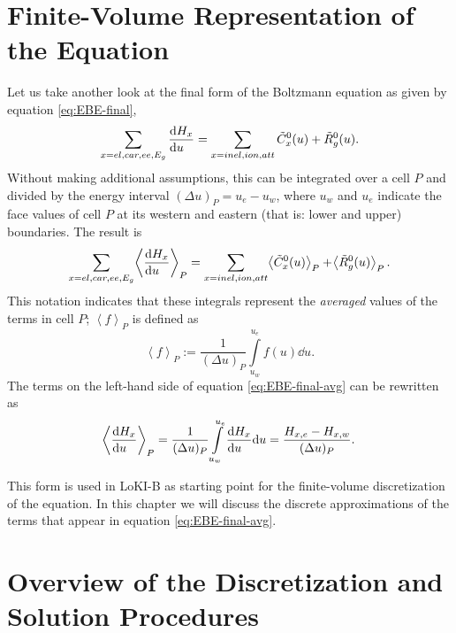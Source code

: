 \documentclass{book}
\newcommand{\MEAN}[1]{\ensuremath{\!\left\langle{{#1}}\right\rangle}}
\begin{document}
\section{Finite-Volume Representation of the Equation}

Let us take another look at the final form of the Boltzmann equation as given
by equation \eqref{eq:EBE-final},
\[
	\sum\limits_{x=el,car,ee,E_g}\DERIV{H_x}{u}
	=
	\sum\limits_{x=inel,ion,att}\tilde{C}^0_{x}(u)
	+
	\tilde{R}^0_g(u).
\]
Without making additional assumptions, this can be integrated
over a cell $P$ and divided by the energy interval $(\Delta u)_P = u_e-u_w$, where
$u_w$ and $u_e$ indicate the face values of cell $P$ at its western and eastern
(that is: lower and upper) boundaries. The result is
\begin{equation}
	\sum\limits_{x=el,car,ee,E_g}\MEAN{\DERIV{H_x}{u}}_P
	=
	\sum\limits_{x=inel,ion,att}\MEAN{\tilde{C}^0_{x}(u)}_P
	+
	\MEAN{\tilde{R}^0_g(u)}_P.
	\label{eq:EBE-final-avg}
\end{equation}
This notation indicates that these integrals represent the {\em averaged} values
of the terms in cell $P$; $\MEAN{f}_P$ is defined as
\begin{equation}
	\MEAN{f}_P := \frac{1}{(\Delta u)_P}\int\limits_{u_w}^{u_e} f(u)\dd{u}.
\end{equation}
The terms on the left-hand side of equation \eqref{eq:EBE-final-avg} can be
rewritten as
\begin{equation}
	\MEAN{\DERIV{H_x}{u}}_P
	= \frac{1}{(\Delta u)_P}\int\limits_{u_w}^{u_e}\DERIV{H_x}{u}\dd{u}
	= \frac{H_{x,e}-H_{x,w}}{(\Delta u)_P}.
	\label{eq:mean-dH/du_P}
\end{equation}

This form is used in LoKI-B as starting point for the finite-volume discretization
of the equation. In this chapter we will discuss the discrete approximations of the
terms that appear in equation \eqref{eq:EBE-final-avg}.

\section{Overview of the Discretization and Solution Procedures}
\end{document}
